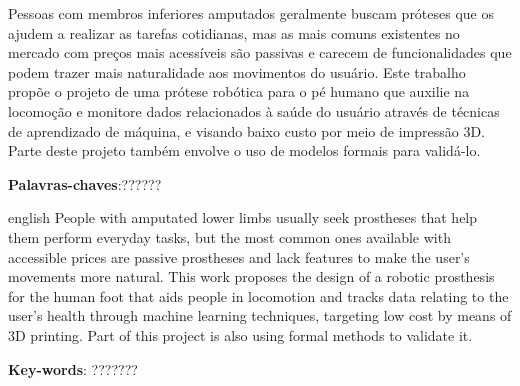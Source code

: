 \documentclass[
    12pt,       %
    oneside,    %
    a4paper,    %
%
    chapter=TITLE,	  	  %
%
    english,			  %
    brazil				  %
%
]{abntex2}
\begin{document}
\setlength{\absparsep}{18pt} %

\begin{resumo}[Resumo]
  Pessoas com membros inferiores amputados geralmente buscam próteses que os ajudem a realizar as tarefas cotidianas, mas as mais comuns existentes no mercado com preços mais acessíveis são passivas e carecem de funcionalidades que podem trazer mais naturalidade aos movimentos do usuário. Este trabalho propõe o projeto de uma prótese robótica para o pé humano que auxilie na locomoção e monitore dados relacionados à saúde do usuário através de técnicas de aprendizado de máquina, e visando baixo custo por meio de impressão 3D. Parte deste projeto também envolve o uso de modelos formais para validá-lo.

 \vspace{\onelineskip}

 \noindent
 \textbf{Palavras-chaves}:??????%
\end{resumo}


\begin{resumo}[Abstract]
 \begin{otherlanguage*}{english}
   People with amputated lower limbs usually seek prostheses that help them perform everyday tasks, but the most common ones available with accessible prices are passive prostheses and lack features to make the user's movements more natural. This work proposes the design of a robotic prosthesis for the human foot that aids people in locomotion and tracks data relating to the user's health through machine learning techniques, targeting low cost by means of 3D printing. Part of this project is also using formal methods to validate it.
  
  \vspace{\onelineskip}

    \noindent
    \textbf{Key-words}: ???????%
 \end{otherlanguage*}
\end{resumo}
\end{document}
